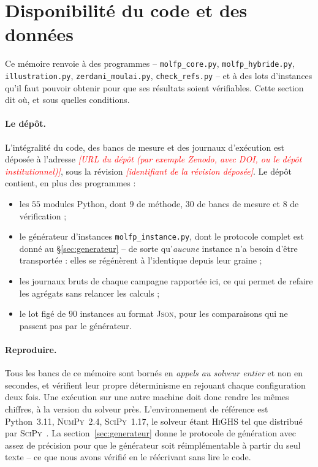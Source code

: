 \documentclass[11pt,a4paper]{article}
\theoremstyle{plain}
\theoremstyle{remark}
\newcommand{\aRemplir}[1]{\textcolor{red}{\itshape[#1]}}
\begin{document}
\appendix

\section{Disponibilité du code et des données}
\label{sec:dispo}

Ce mémoire renvoie à des programmes -- \texttt{molfp\_core.py},
\texttt{molfp\_hybride.py}, \texttt{illustration.py},
\texttt{zerdani\_moulai.py}, \texttt{check\_refs.py} -- et à des lots
d'instances qu'il faut pouvoir obtenir pour que ses résultats soient
vérifiables. Cette section dit où, et sous quelles conditions.

\paragraph{Le dépôt.} L'intégralité du code, des bancs de mesure et des
journaux d'exécution est déposée à l'adresse
\aRemplir{URL du dépôt (par exemple Zenodo, avec DOI, ou le dépôt
institutionnel)}, sous la révision \aRemplir{identifiant de la révision
déposée}. Le dépôt contient, en plus des programmes :
\begin{itemize}[leftmargin=1.4em]
\item les $55$ modules Python, dont $9$ de méthode, $30$ de bancs de mesure
  et $8$ de vérification ;
\item le générateur d'instances \texttt{molfp\_instance.py}, dont le
  protocole complet est donné au §\ref{sec:generateur} -- de sorte
  qu'\emph{aucune} instance n'a besoin d'être transportée : elles se
  régénèrent à l'identique depuis leur graine ;
\item les journaux bruts de chaque campagne rapportée ici, ce qui permet de
  refaire les agrégats sans relancer les calculs ;
\item le lot figé de $90$ instances au format \textsc{Json}, pour les
  comparaisons qui ne passent pas par le générateur.
\end{itemize}

\paragraph{Reproduire.} Tous les bancs de ce mémoire sont bornés en
\emph{appels au solveur entier} et non en secondes, et vérifient leur
propre déterminisme en rejouant chaque configuration deux fois. Une
exécution sur une autre machine doit donc rendre les mêmes chiffres, à la
version du solveur près. L'environnement de référence est Python~3.11,
\textsc{NumPy}~2.4, \textsc{SciPy}~1.17, le solveur étant \textsc{HiGHS}
tel que distribué par \textsc{SciPy}~\cite{huangfu2018}. La
section~\ref{sec:generateur} donne le protocole
de génération avec assez de précision pour que le générateur
soit réimplémentable à partir du seul texte -- ce que nous avons vérifié
en le réécrivant sans lire le code.
\end{document}
